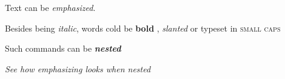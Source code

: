 \documentclass{article}
\begin{document}
Text can be \emph{emphasized}.

Besides being \textit{italic}, words cold be \textbf{bold}
, \textsl{slanted} or typeset in \textsc{small caps}

Such commands can be \textit{\textbf{nested}}

\emph{See how \emph{emphasizing} looks when nested}
\end{document}
